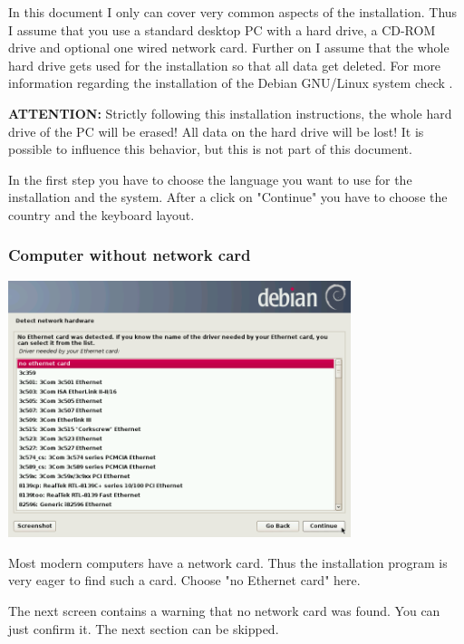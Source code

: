 \documentclass[a4paper,12pt,twoside]{article}
\begin{document}
In this document I only can cover very common aspects of the
installation. Thus I assume that you use a standard desktop PC with a
hard drive, a CD-ROM drive and optional one wired network card. Further
on I assume that the whole hard drive gets used for the installation so
that all data get deleted. For more information regarding the
installation of the Debian GNU/Linux system check \cite{DEB2}.

\textbf{ATTENTION:} Strictly following this installation instructions, the whole
hard drive of the PC will be erased! All data on the hard drive will be
lost! It is possible to influence this behavior, but this is not part
of this document.

In the first step you have to choose the language you want to use for
the installation and the system. After a click on
"Continue" you have to choose the country
and the keyboard layout.


\subsubsection{Computer without network card}
\label{sct:inst_no_net}

\begin{minipage}{\linewidth}
  \centering
  \includegraphics[width=10cm]{efaLiveen-img/efaLiveen-img5.png}
  \label{fig:inst_netzwerkkarte}
\end{minipage}
\bigskip

Most modern computers have a network card. Thus the installation program
is very eager to find such a card. Choose "no Ethernet card" here.

The next screen contains a warning that no network card was found. You can
just confirm it. The next section can be skipped.
\end{document}
